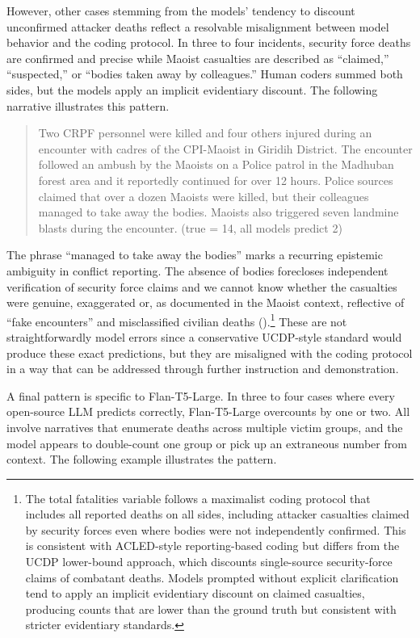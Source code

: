 \documentclass[
  11pt,
]{article}
\begin{document}
However, other cases stemming from the models' tendency to discount
unconfirmed attacker deaths reflect a resolvable misalignment between
model behavior and the coding protocol. In three to four incidents,
security force deaths are confirmed and precise while Maoist casualties
are described as ``claimed,'' ``suspected,'' or ``bodies taken away by
colleagues.'' Human coders summed both sides, but the models apply an
implicit evidentiary discount. The following narrative illustrates this
pattern.

\begin{quote}
Two CRPF personnel were killed and four others injured during an
encounter with cadres of the CPI-Maoist in Giridih District. The
encounter followed an ambush by the Maoists on a Police patrol in the
Madhuban forest area and it reportedly continued for over 12 hours.
Police sources claimed that over a dozen Maoists were killed, but their
colleagues managed to take away the bodies. Maoists also triggered seven
landmine blasts during the encounter. (true = 14, all models predict 2)
\end{quote}

\noindent The phrase ``managed to take away the bodies'' marks a
recurring epistemic ambiguity in conflict reporting. The absence of
bodies forecloses independent verification of security force claims and
we cannot know whether the casualties were genuine, exaggerated or, as
documented in the Maoist context, reflective of ``fake encounters'' and
misclassified civilian deaths ().\footnote{The total fatalities variable follows a
  maximalist coding protocol that includes all reported deaths on all
  sides, including attacker casualties claimed by security forces even
  where bodies were not independently confirmed. This is consistent with
  ACLED-style reporting-based coding but differs from the UCDP
  lower-bound approach, which discounts single-source security-force
  claims of combatant deaths. Models prompted without explicit
  clarification tend to apply an implicit evidentiary discount on
  claimed casualties, producing counts that are lower than the ground
  truth but consistent with stricter evidentiary standards.} These are
not straightforwardly model errors since a conservative UCDP-style
standard would produce these exact predictions, but they are misaligned
with the coding protocol in a way that can be addressed through further
instruction and demonstration.

A final pattern is specific to Flan-T5-Large. In three to four cases
where every open-source LLM predicts correctly, Flan-T5-Large overcounts
by one or two. All involve narratives that enumerate deaths across
multiple victim groups, and the model appears to double-count one group
or pick up an extraneous number from context. The following example
illustrates the pattern.
\end{document}
